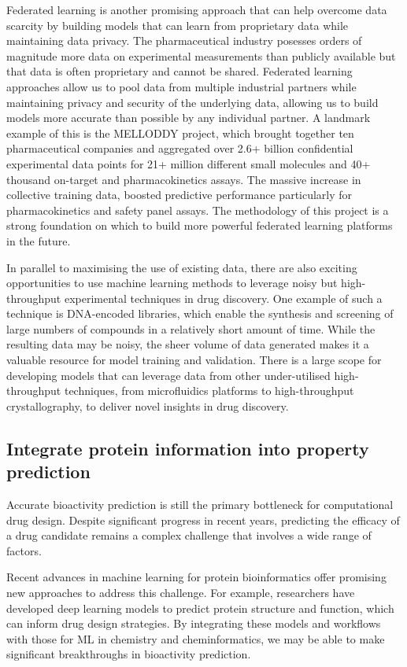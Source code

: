 Federated learning is another promising approach that can help overcome data scarcity by building models that can learn from proprietary data while maintaining data privacy. The pharmaceutical industry posesses orders of magnitude more data on experimental measurements than publicly available but that data is often proprietary and cannot be shared. Federated learning approaches allow us to pool data from multiple industrial partners while maintaining privacy and security of the underlying data, allowing us to build models more accurate than possible by any individual partner. A landmark example of this is the MELLODDY project, which brought together ten pharmaceutical companies and aggregated over 2.6+ billion confidential experimental data points for 21+ million different small molecules and 40+ thousand on-target and pharmacokinetics assays. The massive increase in collective training data, boosted predictive performance particularly for pharmacokinetics and safety panel assays. The methodology of this project is a strong foundation on which to build more powerful federated learning platforms in the future.

In parallel to maximising the use of existing data, there are also exciting opportunities to use machine learning methods to leverage noisy but high-throughput experimental techniques in drug discovery. One example of such a technique is DNA-encoded libraries, which enable the synthesis and screening of large numbers of compounds in a relatively short amount of time. While the resulting data may be noisy, the sheer volume of data generated makes it a valuable resource for model training and validation. There is a large scope for developing models that can leverage data from other under-utilised high-throughput techniques, from microfluidics platforms to high-throughput crystallography, to deliver novel insights in drug discovery.

\subsection{Integrate protein information into property prediction}
Accurate bioactivity prediction is still the primary bottleneck for computational drug design. Despite significant progress in recent years, predicting the efficacy of a drug candidate remains a complex challenge that involves a wide range of factors.

Recent advances in machine learning for protein bioinformatics offer promising new approaches to address this challenge. For example, researchers have developed deep learning models to predict protein structure and function, which can inform drug design strategies. By integrating these models and workflows with those for ML in chemistry and cheminformatics, we may be able to make significant breakthroughs in bioactivity prediction.

